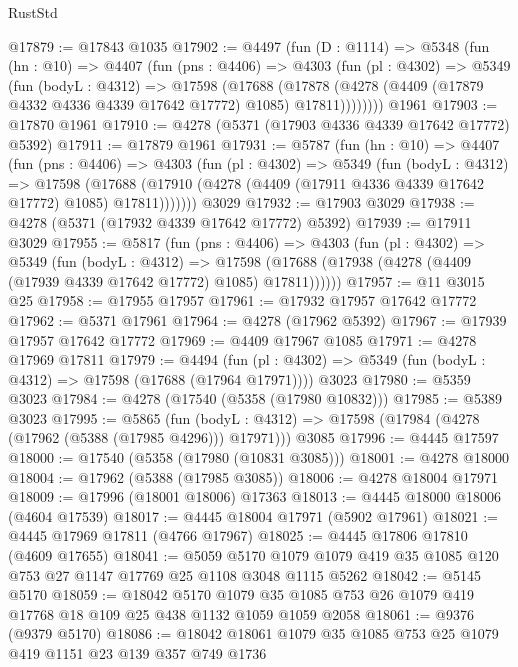 \begin{lexlean}{RustStd}
\begin{coremodule}
{\begin{coremodule}
{{{{{{{{{{{{{{{{{{{{{{{{{{{{{{{{{{{@17879 := @17843 @1035
@17902 := @4497
    (fun (D : @1114) =>
    @5348
      (fun (hn : @10) =>
      @4407
        (fun (pns : @4406) =>
        @4303
          (fun (pl : @4302) =>
          @5349
            (fun (bodyL : @4312) =>
            @17598
              (@17688
                (@17878 (@4278 (@4409 (@17879 @4332 @4336 @4339 @17642 @17772) @1085) @17811))))))))
    @1961
@17903 := @17870 @1961
@17910 := @4278 (@5371 (@17903 @4336 @4339 @17642 @17772) @5392)
@17911 := @17879 @1961
@17931 := @5787
    (fun (hn : @10) =>
    @4407
      (fun (pns : @4406) =>
      @4303
        (fun (pl : @4302) =>
        @5349
          (fun (bodyL : @4312) =>
          @17598
            (@17688 (@17910 (@4278 (@4409 (@17911 @4336 @4339 @17642 @17772) @1085) @17811)))))))
    @3029
@17932 := @17903 @3029
@17938 := @4278 (@5371 (@17932 @4339 @17642 @17772) @5392)
@17939 := @17911 @3029
@17955 := @5817
    (fun (pns : @4406) =>
    @4303
      (fun (pl : @4302) =>
      @5349
        (fun (bodyL : @4312) =>
        @17598 (@17688 (@17938 (@4278 (@4409 (@17939 @4339 @17642 @17772) @1085) @17811))))))
@17957 := @11 @3015 @25
@17958 := @17955 @17957
@17961 := @17932 @17957 @17642 @17772
@17962 := @5371 @17961
@17964 := @4278 (@17962 @5392)
@17967 := @17939 @17957 @17642 @17772
@17969 := @4409 @17967 @1085
@17971 := @4278 @17969 @17811
@17979 := @4494
    (fun (pl : @4302) => @5349 (fun (bodyL : @4312) => @17598 (@17688 (@17964 @17971))))
    @3023
@17980 := @5359 @3023
@17984 := @4278 (@17540 (@5358 (@17980 @10832)))
@17985 := @5389 @3023
@17995 := @5865
    (fun (bodyL : @4312) => @17598 (@17984 (@4278 (@17962 (@5388 (@17985 @4296))) @17971)))
    @3085
@17996 := @4445 @17597
@18000 := @17540 (@5358 (@17980 (@10831 @3085)))
@18001 := @4278 @18000
@18004 := @17962 (@5388 (@17985 @3085))
@18006 := @4278 @18004 @17971
@18009 := @17996 (@18001 @18006) @17363
@18013 := @4445 @18000 @18006 (@4604 @17539)
@18017 := @4445 @18004 @17971 (@5902 @17961)
@18021 := @4445 @17969 @17811 (@4766 @17967)
@18025 := @4445 @17806 @17810 (@4609 @17655)
@18041 := @5059
    @5170
    @1079
    @1079
    @419
    @35
    @1085
    @120
    @753
    @27
    @1147
    @17769
    @25
    @1108
    @3048
    @1115
    @5262
@18042 := @5145 @5170
@18059 := @18042
    @5170
    @1079
    @35
    @1085
    @753
    @26
    @1079
    @419
    @17768
    @18
    @109
    @25
    @438
    @1132
    @1059
    @1059
    @2058
@18061 := @9376 (@9379 @5170)
@18086 := @18042
    @18061
    @1079
    @35
    @1085
    @753
    @25
    @1079
    @419
    @1151
    @23
    @139
    @357
    @749
    @1736
}}}}}}}}}}}}}}}}}}}}}}}}}}}}}}}}}}}
\end{coremodule}}
\end{coremodule}
\end{lexlean}
